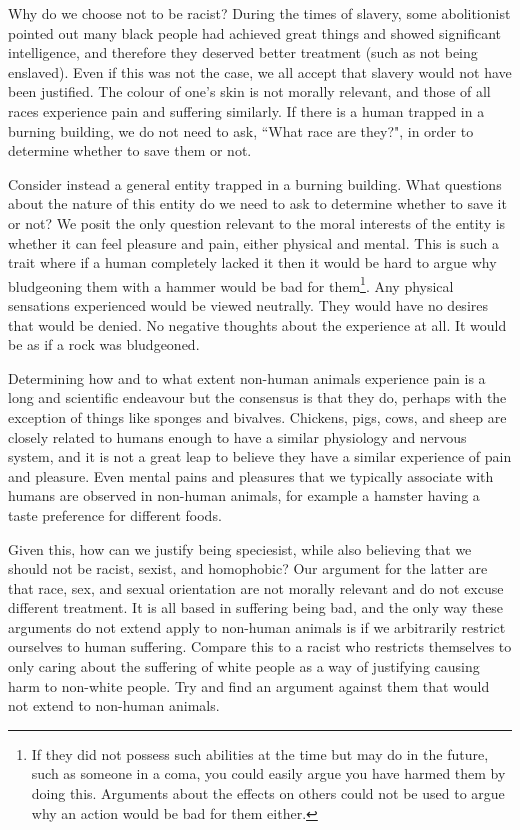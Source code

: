 Why do we choose not to be racist? During the times of slavery, some abolitionist pointed out many black people had achieved great things and showed significant intelligence, and therefore they deserved better treatment (such as not being enslaved). Even if this was not the case, we all accept that slavery would not have been justified. The colour of one's skin is not morally relevant, and those of all races experience pain and suffering similarly. If there is a human trapped in a burning building, we do not need to ask, ``What race are they?", in order to determine whether to save them or not.

Consider instead a general entity trapped in a burning building. What questions about the nature of this entity do we need to ask to determine whether to save it or not? We posit the only question relevant to the moral interests of the entity is whether it can feel pleasure and pain, either physical and mental. This is such a trait where if a human completely lacked it then it would be hard to argue why bludgeoning them with a hammer would be bad for them\footnote{If they did not possess such abilities at the time but may do in the future, such as someone in a coma, you could easily argue you have harmed them by doing this. Arguments about the effects on others could not be used to argue why an action would be bad for them either.}. Any physical sensations experienced would be viewed neutrally. They would have no desires that would be denied. No negative thoughts about the experience at all. It would be as if a rock was bludgeoned.

Determining how and to what extent non-human animals experience pain is a long and scientific endeavour but the consensus is that they do, perhaps with the exception of things like sponges and bivalves. Chickens, pigs, cows, and sheep are closely related to humans enough to have a similar physiology and nervous system, and it is not a great leap to believe they have a similar experience of pain and pleasure. Even mental pains and pleasures that we typically associate with humans are observed in non-human animals, for example a hamster having a taste preference for different foods.

Given this, how can we justify being speciesist, while also believing that we should not be racist, sexist, and homophobic? Our argument for the latter are that race, sex, and sexual orientation are not morally relevant and do not excuse different treatment. It is all based in suffering being bad, and the only way these arguments do not extend apply to non-human animals is if we arbitrarily restrict ourselves to human suffering. Compare this to a racist who restricts themselves to only caring about the suffering of white people as a way of justifying causing harm to non-white people. Try and find an argument against them that would not extend to non-human animals.

